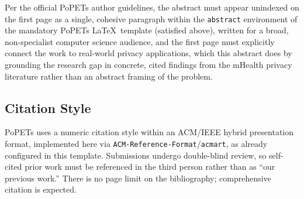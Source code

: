 \documentclass[sigconf,balance=false]{acmart}
\begin{document}
Per the official PoPETs author guidelines, the abstract must appear
unindexed on the first page as a single, cohesive paragraph within the
\texttt{abstract} environment of the mandatory PoPETs \LaTeX\ template
(satisfied above), written for a broad, non-specialist computer science
audience, and the first page must explicitly connect the work to
real-world privacy applications, which this abstract does by grounding the
research gap in concrete, cited findings from the mHealth privacy
literature rather than an abstract framing of the problem.

\subsection{Citation Style}

PoPETs uses a numeric citation style within an ACM/IEEE hybrid
presentation format, implemented here via
\texttt{ACM-Reference-Format}\slash \texttt{acmart}, as already configured
in this template. Submissions undergo double-blind review, so self-cited
prior work must be referenced in the third person rather than as ``our
previous work.'' There is no page limit on the bibliography; comprehensive
citation is expected.



\end{document}
